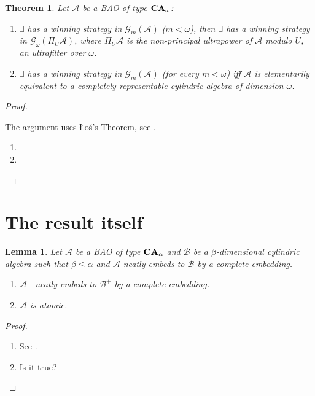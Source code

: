 \documentclass[a4paper]{article}
\theoremstyle{defin}
\theoremstyle{theorem}
\newtheorem{theorem}{Theorem}
\theoremstyle{prop}
\theoremstyle{lemma}
\newtheorem{lemma}{Lemma}
\theoremstyle{fact}
\theoremstyle{ex}
\theoremstyle{col}
\let\strokeL\L
\DeclareRobustCommand{\L}{\ifmmode\mathbf{L}\else\strokeL\fi}
\begin{document}
\begin{theorem} Let $\mathcal{A}$ be a BAO of type ${\bf CA}_{\omega}$:

\begin{enumerate}
  \item $\exists$ has a winning strategy in $\mathcal{G}_{m}(\mathcal{A})$ ($m < \omega$), then $\exists$ has a winning strategy in $\mathcal{G}_{\omega}(\Pi_U \mathcal{A})$, where $\Pi_U \mathcal{A}$ is the non-principal ultrapower of $\mathcal{A}$ modulo $U$, an ultrafilter over $\omega$.
  \item $\exists$ has a winning strategy in $\mathcal{G}_{m}(\mathcal{A})$ (for every $m < \omega$) iff $\mathcal{A}$ is elementarily equivalent to a completely representable cylindric algebra of dimension $\omega$.
\end{enumerate}
\end{theorem}

\begin{proof}
  $ $

  The argument uses \L o\'s's Theorem, see \cite[Theorem 8.5.3]{hodges1997shorter}.

  \begin{enumerate}
    \item
    \item
  \end{enumerate}
\end{proof}

\section{The result itself}

\begin{lemma}\label{Neat}
  Let $\mathcal{A}$ be a BAO of type ${\bf CA}_{\alpha}$ and $\mathcal{B}$ be a $\beta$-dimensional cylindric algebra such that $\beta \leq \alpha$ and $\mathcal{A}$ neatly embeds to $\mathcal{B}$ by a complete embedding.

  \begin{enumerate}
  \item $\mathcal{A}^{+}$ neatly embeds to $\mathcal{B}^{+}$ by a complete embedding.
  \item $\mathcal{A}$ is atomic.
  \end{enumerate}
\end{lemma}

\begin{proof}
$ $

\begin{enumerate}
  \item See \cite[Remark 2.7.25]{henkin1971cylindric}.
  \item Is it true?
\end{enumerate}
\end{proof}
\end{document}
